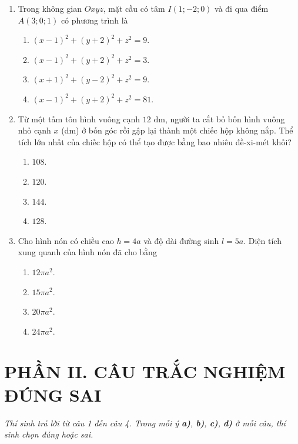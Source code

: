 \documentclass[12pt,a4paper]{article}
\begin{document}
\begin{enumerate}[label=\textbf{Câu \arabic*:}, leftmargin=*]
\item Trong không gian $Oxyz$, mặt cầu có tâm $I(1; -2; 0)$ và đi qua điểm $A(3; 0; 1)$ có phương trình là
\begin{enumerate}[label=\Alph*.]
    \item $(x - 1)^2 + (y + 2)^2 + z^2 = 9$.
    \item $(x - 1)^2 + (y + 2)^2 + z^2 = 3$.
    \item $(x + 1)^2 + (y - 2)^2 + z^2 = 9$.
    \item $(x - 1)^2 + (y + 2)^2 + z^2 = 81$.
\end{enumerate}

\item Từ một tấm tôn hình vuông cạnh $12\text{ dm}$, người ta cắt bỏ bốn hình vuông nhỏ cạnh $x$ (dm) ở bốn góc rồi gập lại thành một chiếc hộp không nắp. Thể tích lớn nhất của chiếc hộp có thể tạo được bằng bao nhiêu đề-xi-mét khối?
\begin{enumerate}[label=\Alph*.]
    \item $108$.
    \item $120$.
    \item $144$.
    \item $128$.
\end{enumerate}

\item Cho hình nón có chiều cao $h = 4a$ và độ dài đường sinh $l = 5a$. Diện tích xung quanh của hình nón đã cho bằng
\begin{enumerate}[label=\Alph*.]
    \item $12\pi a^2$.
    \item $15\pi a^2$.
    \item $20\pi a^2$.
    \item $24\pi a^2$.
\end{enumerate}

\end{enumerate}

\vspace{0.4cm}
\section*{\large PHẦN II. CÂU TRẮC NGHIỆM ĐÚNG SAI}
\textit{Thí sinh trả lời từ câu 1 đến câu 4. Trong mỗi ý \textbf{a)}, \textbf{b)}, \textbf{c)}, \textbf{d)} ở mỗi câu, thí sinh chọn đúng hoặc sai.}
\end{document}

